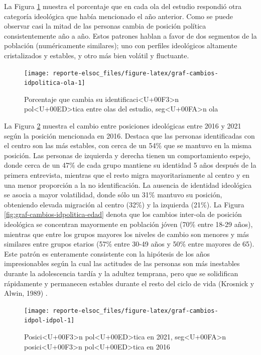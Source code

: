 \documentclass[
  12pt,
]{book}
\begin{document}
La Figura \ref{fig:graf-cambios-idpolitica-ola} muestra el porcentaje que en cada ola del estudio respondió otra categoría ideológica que había mencionado el año anterior. Como se puede observar casi la mitad de las personas cambia de posición política consistentemente año a año. Estos patrones hablan a favor de dos segmentos de la población (numéricamente similares); uno con perfiles ideológicos altamente cristalizados y estables, y otro más bien volátil y fluctuante.

\begin{figure}

{\centering \texttt{[image: reporte-elsoc\_files/figure-latex/graf-cambios-idpolitica-ola-1]} 

}

\caption{Porcentaje que cambia su identificaci<U+00F3>n pol<U+00ED>tica entre olas del estudio, seg<U+00FA>n ola}\label{fig:graf-cambios-idpolitica-ola}
\end{figure}

La Figura \ref{fig:graf-cambios-idpol-idpol} muestra el cambio entre posiciones ideológicas entre 2016 y 2021 según la posición mencionada en 2016. Destaca que las personas identificadas con el centro son las más estables, con cerca de un 54\% que se mantuvo en la misma posición. Las personas de izquierda y derecha tienen un comportamiento espejo, donde cerca de un 47\% de cada grupo mantiene su identidad 5 años después de la primera entrevista, mientras que el resto migra mayoritariamente al centro y en una menor proporción a la no identificación. La ausencia de identidad ideológica se asocia a mayor volatilidad, donde sólo un 31\% mantuvo su posición, obteniendo elevada migración al centro (32\%) y la izquierda (21\%). La Figura \ref{fig:graf-cambios-idpolitica-edad} denota que los cambios inter-ola de posición ideológica se concentran mayormente en población jóven (70\% entre 18-29 años), mientras que entre los grupos mayores los niveles de cambio son menores y más similares entre grupos etarios (57\% entre 30-49 años y 50\% entre mayores de 65). Este patrón es enteramente consistente con la hipótesis de los años impresionables según la cual las actitudes de las personas son más inestables durante la adolescencia tardía y la adultez temprana, pero que se solidifican rápidamente y permanecen estables durante el resto del ciclo de vida (Krosnick y Alwin, 1989) .

\begin{figure}

{\centering \texttt{[image: reporte-elsoc\_files/figure-latex/graf-cambios-idpol-idpol-1]} 

}

\caption{Posici<U+00F3>n pol<U+00ED>tica en 2021, seg<U+00FA>n posici<U+00F3>n pol<U+00ED>tica en 2016}\label{fig:graf-cambios-idpol-idpol}
\end{figure}
\end{document}
